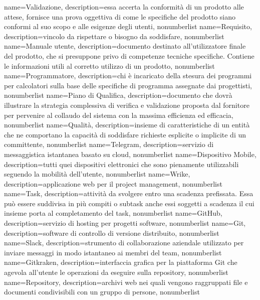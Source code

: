 {
name={Validazione},
description={essa accerta la conformità di un prodotto alle attese, fornisce una prova oggettiva di come le specifiche del prodotto siano conformi al suo scopo e alle esigenze degli utenti},
nonumberlist 
}
{
name={Requisito},
description={vincolo da rispettare o bisogno da soddisfare},
nonumberlist 
}
{
name={Manuale utente},
description={documento destinato all'utilizzatore finale del prodotto, che si presuppone privo di competenze tecniche specifiche. Contiene le informazioni utili al corretto utilizzo di un prodotto},
nonumberlist 
}
{
name={Programmatore},
description={chi è incaricato della stesura dei programmi per calcolatori sulla base delle specifiche di programma assegnate dai progettisti},
nonumberlist 
}
{
name={Piano di Qualifica},
description={documento che dovrà illustrare la strategia complessiva di verifica e validazione proposta dal fornitore per pervenire al collaudo del sistema con la massima efficienza ed efficacia},
nonumberlist 
}
{
name={Qualità},
description={insieme di caratteristiche di un entità che ne comportano la capacità di soddisfare richieste esplicite o implicite di un committente},
nonumberlist 
}
{
name={Telegram},
description={servizio di messaggistica istantanea basato su cloud},
nonumberlist 
}
{
name={Dispositivo Mobile},
description={tutti quei dispositivi elettronici che sono pienamente utilizzabili seguendo la mobilità dell'utente},
nonumberlist 
}
{
name={Wrike},
description={applicazione web per il project management},
nonumberlist 
}
{
name={Task},
description={attività da svolgere entro una scadenza prefissata. Essa può essere suddivisa in più compiti o subtask anche essi soggetti a scadenza il cui insieme porta al completamento del task},
nonumberlist 
}
{
name={GitHub},
description={servizio di hosting per progetti software},
nonumberlist 
}
{
name={Git},
description={software di controllo di versione distribuito},
nonumberlist
}
{
name={Slack},
description={strumento di collaborazione aziendale utilizzato per inviare messaggi in modo istantaneo ai membri del team},
nonumberlist
}
{
name={Gitkraken},
description={interfaccia grafica per la piattaforma Git che agevola all'utente le operazioni da eseguire sulla repository},
nonumberlist
}
{
name={Repository},
description={archivi web nei quali vengono raggruppati file e documenti condivisibili con un gruppo di persone},
nonumberlist
}